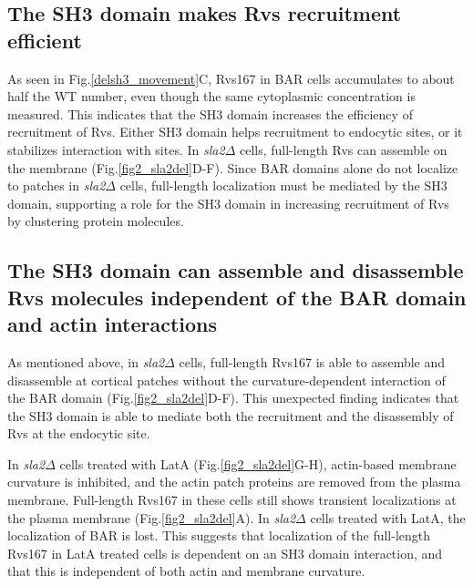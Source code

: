 \subsection{The SH3 domain makes Rvs recruitment efficient} 
As seen in Fig.\ref{delsh3_movement}C, Rvs167 in BAR cells accumulates to about half the WT number, even though the same cytoplasmic concentration is measured. This indicates that the SH3 domain increases the efficiency of recruitment of Rvs. Either SH3 domain helps recruitment to endocytic sites, or it stabilizes interaction with sites. In \textit{sla2$\Delta$}  cells, full-length Rvs can assemble on the membrane (Fig.\ref{fig2_sla2del}D-F). Since BAR domains alone do not localize to patches in \textit{sla2$\Delta$}  cells, full-length localization must be mediated by the SH3 domain, supporting a role for the SH3 domain in increasing recruitment of Rvs by clustering protein molecules. 


\subsection{The SH3 domain can assemble and disassemble Rvs molecules independent of the BAR domain and actin interactions} 
As mentioned above, in \textit{sla2$\Delta$}  cells, full-length Rvs167 is able to assemble and disassemble at cortical patches without the curvature-dependent interaction of the BAR domain (Fig.\ref{fig2_sla2del}D-F). This unexpected finding indicates that the SH3 domain is able to mediate both the recruitment and the disassembly of Rvs at the endocytic site. 


	\vspace{5mm}
In \textit{sla2$\Delta$}  cells treated with LatA (Fig.\ref{fig2_sla2del}G-H), actin-based membrane curvature is inhibited, and the actin patch proteins are removed from the plasma membrane. Full-length Rvs167 in these cells still shows transient localizations at the plasma membrane (Fig.\ref{fig2_sla2del}A). In \textit{sla2$\Delta$} cells treated with LatA, the localization of BAR is lost. This suggests that localization of the full-length Rvs167 in LatA treated cells is dependent on an SH3 domain interaction, and that this is independent of both actin and membrane curvature. 


